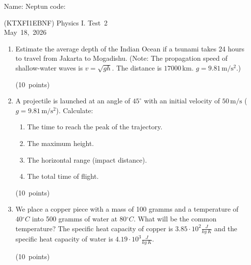 \documentclass[12pt]{letter}
\begin{document}
Name: \hrulefill \quad Neptun code: \hrulefill

\begin{center}
(KTXFI1EBNF) Physics I. Test~2 \\
May~18,~2026 
\end{center}

\bigskip

\begin{enumerate}
\setcounter{enumi}{0}

\item Estimate the average depth of the Indian Ocean if a tsunami takes 24 hours to travel from Jakarta to Mogadishu. (Note: The propagation speed of shallow-water waves is $v=\sqrt{gh}$. The distance is $17000$\,km. $g=9.81\,\mathrm{m/s^{2}}.$)

\hfill (10~points)


\bigskip
\item A projectile is launched at an angle of $45^\circ$ with an initial velocity of $50\,\text{m/s}$ ($g=9.81\,\mathrm{m/s^{2}}$). 
Calculate:
\begin{enumerate}
    \item[(a)] The time to reach the peak of the trajectory.
    \item[(b)] The maximum height.
    \item[(c)] The horizontal range (impact distance).
    \item[(d)] The total time of flight.
\end{enumerate}     

\hfill (10~points)


\bigskip
\item We place a copper piece with a mass of 100 gramms and a temperature of $40{}^{\circ}C$ into 500 gramms of water at $80{}^{\circ}C$. What will be the common temperature? The specific heat capacity of copper is $3.85 \cdot 10^{2}\frac{J}{kg\,K}$ and the specific heat capacity of water is $4.19 \cdot 10^{3}\frac{J}{kg\,K}$.

\hfill (10~points)



\end{enumerate}
\end{document}
